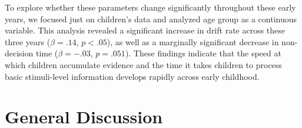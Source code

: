 \documentclass[10pt,letterpaper]{article}
\begin{document}
To explore whether these parameters change significantly throughout these early years, we focused just on children's data and analyzed age group as a continuous variable.  This analysis revealed a significant increase in drift rate across these three years ($\beta = .14$, $p < .05$), as well as a marginally significant decrease in non-decision time ($\beta = -.03$, $p = .051$).  These findings indicate that the speed at which children accumulate evidence and the time it takes children to process basic stimuli-level information develops rapidly across early childhood.  


\section{General Discussion}

%



\setlength{\bibleftmargin}{.125in}
\setlength{\bibindent}{-\bibleftmargin}


\end{document}
